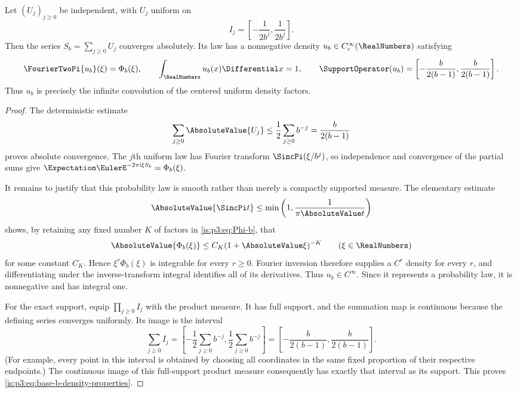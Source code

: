 \begin{proposition}
\label{is:p3:prop:base-b-density}
Let $(U_j)_{j\ge0}$ be independent, with $U_j$ uniform on
\[
 I_j=\left[-\frac1{2b^j},\frac1{2b^j}\right].
\]
Then the series $S_b=\sum_{j\ge0}U_j$ converges absolutely.  Its law has a
nonnegative density $u_b\in C_c^\infty(\RealNumbers)$ satisfying
\begin{equation}
 \FourierTwoPi{u_b}(\xi)=\Phi_b(\xi),
 \qquad
 \int_{\RealNumbers}u_b(x)\Differential x=1,
 \qquad
 \SupportOperator(u_b)=
 \left[-\frac{b}{2(b-1)},\frac{b}{2(b-1)}\right].
 \label{is:p3:eq:base-b-density-properties}
\end{equation}
Thus $u_b$ is precisely the infinite convolution of the centered uniform
density factors.
\end{proposition}

\begin{proof}
The deterministic estimate
\[
 \sum_{j\ge0}\AbsoluteValue{U_j}
 \le\frac12\sum_{j\ge0}b^{-j}=\frac{b}{2(b-1)}
\]
proves absolute convergence.  The $j$th uniform law has Fourier transform
$\SincPi(\xi/b^j)$, so independence and convergence of the partial sums give
$\Expectation\EulerE^{-2\pi\iu\xi S_b}=\Phi_b(\xi)$.

It remains to justify that this probability law is smooth rather than merely
a compactly supported measure.  The elementary estimate
\[
 \AbsoluteValue{\SincPi t}\le
 \min\left(1,\frac1{\pi\AbsoluteValue t}\right)
\]
shows, by retaining any fixed number $K$ of factors in
\eqref{is:p3:eq:Phi-b}, that
\[
 \AbsoluteValue{\Phi_b(\xi)}\le C_K(1+\AbsoluteValue\xi)^{-K}
 \qquad(\xi\in\RealNumbers)
\]
for some constant $C_K$.  Hence $\xi^r\Phi_b(\xi)$ is integrable for every
$r\ge0$.  Fourier inversion therefore supplies a $C^r$ density for every
$r$, and differentiating under the inverse-transform integral identifies all
of its derivatives.  Thus $u_b\in C^\infty$.  Since it represents a
probability law, it is nonnegative and has integral one.

For the exact support, equip $\prod_{j\ge0}I_j$ with the product measure.  It
has full support, and the summation map is continuous because the defining
series converges uniformly.  Its image is the interval
\[
 \sum_{j\ge0}I_j=
 \left[-\frac12\sum_{j\ge0}b^{-j},
        \frac12\sum_{j\ge0}b^{-j}\right]
 =\left[-\frac{b}{2(b-1)},\frac{b}{2(b-1)}\right].
\]
(For example, every point in this interval is obtained by choosing all
coordinates in the same fixed proportion of their respective endpoints.)
The continuous image of this full-support product measure consequently has
exactly that interval as its support.  This proves
\eqref{is:p3:eq:base-b-density-properties}.
\end{proof}

